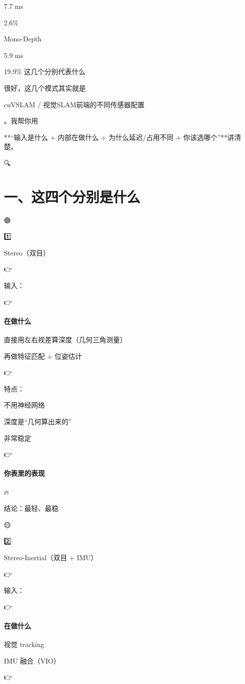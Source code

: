 \documentclass[12pt]{article}
\begin{document}
7.7 ms

2.6\%

Mono-Depth

5.9 ms

19.9\% 这几个分别代表什么

很好，这几个模式其实就是

cuVSLAM / 视觉SLAM前端的不同传感器配置

。我帮你用

**“输入是什么 + 内部在做什么 + 为什么延迟/占用不同 + 你该选哪个”**讲清楚。

🔍

\section{一、这四个分别是什么}
🟢

1️⃣

Stereo（双目）

👉

输入：

👉

\paragraph{在做什么}
直接用左右视差算深度（几何三角测量）

再做特征匹配 + 位姿估计

👉

特点：

不用神经网络

深度是“几何算出来的”

非常稳定

👉

\paragraph{你表里的表现}
🔥

结论：最轻、最稳

🟡

2️⃣

Stereo-Inertial（双目 + IMU）

👉

输入：

👉

\paragraph{在做什么}
视觉 tracking

IMU 融合（VIO）

👉
\end{document}
